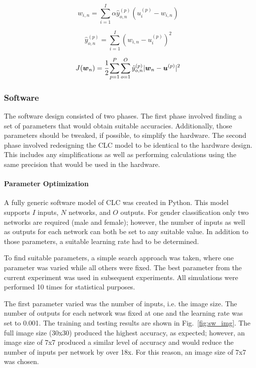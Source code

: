 \documentclass[10pt,journal]{IEEEtran}
\newcommand{\fig}[1]{Fig.~\ref{#1}}
\begin{document}
			\begin{equation}
				\label{sw_weight_update}
				w_{i,n} = \displaystyle\sum_{i=1}^{I}\alpha\hat{y}_{o,n}^{(p)}(u_i^{(p)}-w_{i,n})
			\end{equation}
			
			\begin{equation}
				\label{sw_output}
				\hat{y}_{o,n}^{(p)} = \displaystyle\sum_{i=1}^{I}(w_{i,n} - u_i^{(p)})^2
			\end{equation}
			
			\begin{equation}
				\label{cost_function}
				J(\boldsymbol{w}_n) = \cfrac{1}{2}\displaystyle\sum_{p=1}^{P}\displaystyle\sum_{o=1}^{O}\hat{y}_{o,n}^{(p)}|\boldsymbol{w}_n-\boldsymbol{u}^{(p)}|^2
			\end{equation}
		
		\subsubsection{Software}
			The software design consisted of two phases. The first phase involved finding a set of parameters that would obtain suitable accuracies. Additionally, those parameters should be tweaked, if possible, to simplify the hardware. The second phase involved redesigning the CLC model to be identical to the hardware design. This includes any simplifications as well as performing calculations using the same precision that would be used in the hardware.
			
			\paragraph{Parameter Optimization}
				A fully generic software model of CLC was created in Python. This model supports \(I\) inputs, \(N\) networks, and \(O\) outputs. For gender classification only two networks are required (male and female); however, the number of inputs as well as outputs for each network can both be set to any suitable value. In addition to those parameters, a suitable learning rate had to be determined.
				
				To find suitable parameters, a simple search approach was taken, where one parameter was varied while all others were fixed. The best parameter from the current experiment was used in subsequent experiments. All simulations were performed 10 times for statistical purposes.
				
				The first parameter varied was the number of inputs, i.e. the image size. The number of outputs for each network was fixed at one and the learning rate was set to 0.001. The training and testing results are shown in \fig{fig:sw_img}. The full image size (30x30) produced the highest accuracy, as expected; however, an image size of 7x7 produced a similar level of accuracy and would reduce the number of inputs per network by over 18x. For this reason, an image size of 7x7 was chosen.
				
\end{document}
